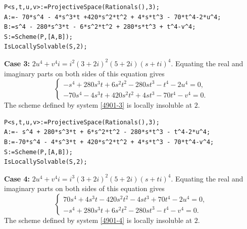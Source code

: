 \documentclass[a4paper,12pt,english,reqno]{amsart}
\begin{document}

\begin{lstlisting}
P<s,t,u,v>:=ProjectiveSpace(Rationals(),3);
A:=- 70*s^4 - 4*s^3*t +420*s^2*t^2 + 4*s*t^3 - 70*t^4-2*u^4;
B:=s^4 - 280*s^3*t - 6*s^2*t^2 + 280*s*t^3 + t^4-v^4;
S:=Scheme(P,[A,B]);
IsLocallySolvable(S,2);
\end{lstlisting}


{\bf Case 3:} $2u^4+v^4i=i^2(3+ 2i)^2(5+ 2i)(s+ti)^4$.  Equating the real and imaginary parts on both sides of this equation gives
\begin{equation}\label{4901-3}
\begin{cases}
-s^4 + 280s^3t + 6s^2t^2 - 280st^3 - t^4 - 2u^4=0,\\
-70s^4 - 4s^3t + 420s^2t^2 + 4st^3 - 70t^4 - v^4=0.
\end{cases}
\end{equation}
The scheme defined by system \eqref{4901-3} is locally insoluble at $2$.


\begin{lstlisting}
P<s,t,u,v>:=ProjectiveSpace(Rationals(),3);
A:=- s^4 + 280*s^3*t + 6*s^2*t^2 - 280*s*t^3 - t^4-2*u^4;
B:=-70*s^4 - 4*s^3*t + 420*s^2*t^2 + 4*s*t^3 - 70*t^4-v^4;
S:=Scheme(P,[A,B]);
IsLocallySolvable(S,2);
\end{lstlisting}


{\bf Case 4:} $2u^4+v^4i=i^3(3+ 2i)^2(5+ 2i)(s+ti)^4$.  Equating the real and imaginary parts on both sides of this equation gives
\begin{equation}\label{4901-4}
\begin{cases}
70s^4 + 4s^3t - 420s^2t^2 - 4st^3 + 70t^4 - 2u^4=0,\\
-s^4 + 280s^3t + 6s^2t^2 - 280st^3 - t^4 - v^4=0.
\end{cases}
\end{equation}
The scheme defined by system \eqref{4901-4} is locally insoluble at $2$.
\end{document}
